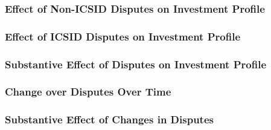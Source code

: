 \documentclass[10pt]{beamer}
\begin{document}
\begin{frame}
\frametitle{Effect of Non-ICSID Disputes on Investment Profile}

\begin{figure}[ht]
	\centering
	\vspace{-5mm}	
	\resizebox{1\textwidth}{!}{}	
\end{figure}

\end{frame}

\begin{frame}
\frametitle{Effect of ICSID Disputes on Investment Profile}

\begin{figure}[ht]
	\centering
	\vspace{-5mm}	
	\resizebox{1\textwidth}{!}{}
\end{figure}

\end{frame}

\begin{frame}
\frametitle{Substantive Effect of Disputes on Investment Profile}

\begin{figure}[ht]
	\centering
	\resizebox{1\textwidth}{!}{}	
\end{figure}

\end{frame}

\begin{frame}
\frametitle{Change over Disputes Over Time}

\begin{figure}[ht]
	\centering
	\resizebox{1\textwidth}{!}{}	
\end{figure}

\end{frame}

\begin{frame}
\frametitle{Substantive Effect of Changes in Disputes}

\begin{figure}[ht]
	\centering
	\resizebox{1\textwidth}{!}{}	
\end{figure}

\end{frame}
\end{document}

